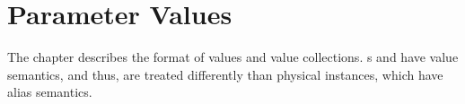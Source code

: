 
\chapter{Parameter Values}
\label{sec:values}

The chapter describes the format of values and value collections.  
s and  have value semantics, and thus, 
are treated differently than physical instances, which have alias semantics.  


